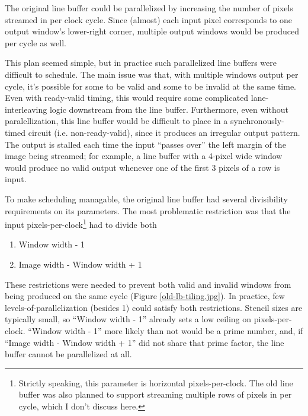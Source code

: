 \documentclass[12pt]{article}
\begin{document}
The original line buffer could be parallelized by increasing the
number of pixels streamed in per clock cycle. Since (almost) each
input pixel corresponds to one output window's lower-right corner,
multiple output windows would be produced per cycle as well.

This plan seemed simple, but in practice such parallelized line
buffers were difficult to schedule. The main issue was that, with
multiple windows output per cycle, it's possible for some to be valid
and some to be invalid at the same time. Even with ready-valid timing,
this would require some
complicated lane-interleaving logic downstream from the line
buffer. Furthermore, even without paralellization, this line buffer
would be difficult to place in a synchronously-timed circuit
(i.e. non-ready-valid), since it produces an irregular output
pattern. The output is stalled each time the input ``passes over'' the
left margin of the image being streamed; for example, a line buffer
with a 4-pixel wide window would produce no valid output whenever
one of the first 3 pixels of a row is input.

To make scheduling managable, the original line buffer had several
divisibility requirements on its parameters. The most problematic
restriction was that the input pixels-per-clock\footnote{
  Strictly speaking, this parameter is horizontal pixels-per-clock.
  The old line buffer was also planned to support streaming multiple
  rows of pixels in per cycle, which I don't discuss here.
} had to divide both

\begin{enumerate}
\item Window width - 1
\item Image width - Window width + 1
\end{enumerate}

These restrictions were needed to prevent both valid and invalid
windows from being produced on the same cycle (Figure
\ref{old-lb-tiling.jpg}). In practice, few levels-of-parallelization
(besides 1) could satisfy both restrictions. Stencil sizes are
typically small, so ``Window width - 1'' already sets a low ceiling on
pixels-per-clock. ``Window width - 1'' more likely than not would be a
prime number, and, if ``Image width - Window width + 1'' did not share
that prime factor, the line buffer cannot be parallelized at all.
\end{document}
